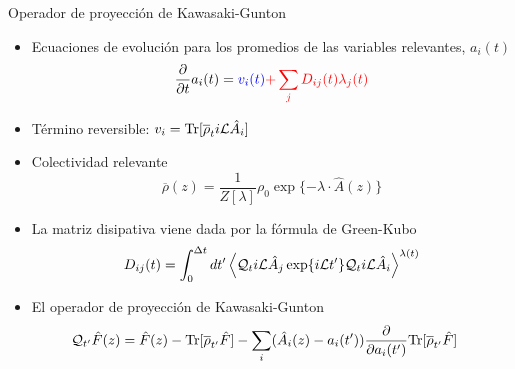 \documentclass{beamer}
\begin{document}
\begin{frame}{Operador de proyección de Kawasaki-Gunton}
  \begin{itemize}
    \item<1-> Ecuaciones de evolución para los promedios de las variables relevantes, $a_i(t)$
\begin{equation}
  \frac{\partial}{\partial t}a_i(t) = {\color{blue} v_i(t)} {\color{red} +\sum_j D_{ij}(t) \lambda_j(t)}
\nonumber
\end{equation}
\item<2-> {\color{blue} Término reversible}: 
    $v_i={\rm Tr}[\overline{\rho}_t i{\cal L}\hat{A}_i]$
\item<3-> Colectividad relevante 
  \begin{equation}
  \overline{\rho}(z) = \frac{1}{Z[\lambda]} \rho_0\exp\{-\lambda\!\cdot\!\hat{A}(z)\}
  \nonumber
  \end{equation}
\item<4-> {\color{red} La matriz disipativa} viene dada por la fórmula de  Green-Kubo
\begin{equation}
D_{ij}(t)=\int_0^{\Delta t} dt'\left\langle 
{\cal Q}_t i{\cal L}\hat{A}_j\exp\{i{\cal L}t'\}{\cal Q}_t i{\cal L}\hat{A}_i
\right\rangle^{\lambda(t)}
\label{dij}
\nonumber
\end{equation}
\item<5-> El operador de proyección de Kawasaki-Gunton  
  \begin{align}
    {\cal Q}_{t'}\hat{F}(z) &= \hat{F}(z)- {\rm Tr}[\overline{\rho}_{t'} \hat{F}]
  -\sum_i(\hat{A}_i(z)-a_i(t'))\frac{\partial }{\partial a_i(t')}
  {\rm Tr}[\overline{\rho}_{t'} \hat{F}]
  \label{Q}
  \nonumber
  \end{align}
\end{itemize}
\end{frame}
\end{document}
